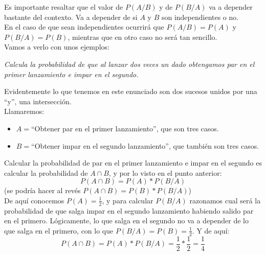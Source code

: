 \documentclass[a4paper,10pt,answers]{exam}
\begin{document}
Es importante resaltar que el valor de $P(A/B)$ y de $P(B/A)$ va a depender bastante del contexto. Va a depender de si $A$ y $B$ son independientes o no.\\
En el caso de que sean independientes ocurrirá que $P(A/B) = P(A)$ y $P(B/A)=P(B)$, mientras que en otro caso no será tan sencillo.\\
Vamos a verlo con unos ejemplos:
\begin{questions}
\question\emph{Calcula la probabilidad de que al lanzar dos veces un dado obtengamos par en el primer lanzamiento e impar en el segundo.}
\begin{solution}
Evidentemente lo que tenemos en este enunciado son dos sucesos unidos por una ``y'', una intersección.\\
Llamaremos:\
\begin{itemize}
	\item $A=$``Obtener par en el primer lanzamiento'', que son tres casos.
	\item $B=$``Obtener impar en el segundo lanzamiento'', que también son tres casos.
\end{itemize}

Calcular la probabilidad de par en el primer lanzamiento e impar en el segundo es calcular la probabilidad de $A \cap B$, y por lo visto en el punto anterior:
\[P(A \cap B) = P(A) * P(B/A)\] (se podría hacer al revés $P(A \cap B) = P(B) * P(B/A)$)\\
De aquí conocemos $P(A) = \frac{1}{2}$, y para calcular $P(B/A)$ razonamos cual será la probabilidad de que salga impar en el segundo lanzamiento habiendo salido par en el primero. Lógicamente, lo que salga en el segundo no va a depender de lo que salga en el primero, con lo que $P(B/A) = P(B) = \frac{1}{2}$. Y de aquí:
\[P(A \cap B) = P(A)*P(B/A) = \frac{1}{2} * \frac{1}{2} = \frac{1}{4}\]


\end{solution}
\end{questions}
\end{document}
